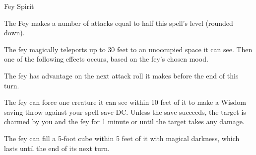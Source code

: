 \documentclass[letterpaper,openany,oneside,twocolumn]{book}
\begin{document}
\begin{DndMonster}[width=0.5\textwidth]{Fey Spirit}
		
	\DndMonsterBasics[
		armor-class = {12 + the level of the spell (Natural Armor)},
		hit-points  = {30 + 10 for each Spell Level above 3rd},
		speed       = {40 ft.},
	]
	
	\renewcommand{\AbilityScoreSpacer}{~}
	\DndMonsterAbilityScores[
		str = 13,
		dex = 16,
		con = 14,
		int = 14,
		wis = 11,
		cha = 16,
	]
		
	\DndMonsterDetails[
		senses = {Darkvision 60ft., Passive Perception 10},
		condition-immunities = {charmed},
		languages = {Sylvan, understands the languages you speak},
	]
	
	The Fey makes a number of attacks equal to half this spell's level (rounded down).
	
	\DndMonsterAttack[
		name=Shortsword,
		distance=melee, %
		mod=+3 + PB,
		reach=5,
		targets=one target,
		dmg={1d6 + 3 + the spell's level},
		dmg-type={piercing},
		plus-dmg={1d6},
		plus-dmg-type={force},
	]
	
	The fey magically teleports up to 30 feet to an unoccupied space it can see. Then one of the following effects occurs, based on the fey's chosen mood.
	
	The fey has advantage on the next attack roll it makes before the end of this turn.
	
	The fey can force one creature it can see within 10 feet of it to make a Wisdom saving throw against your spell save DC. Unless the save succeeds, the target is charmed by you and the fey for 1 minute or until the target takes any damage.
	
	The fey can fill a 5-foot cube within 5 feet of it with magical darkness, which lasts until the end of its next turn.
\end{DndMonster}
\end{document}
